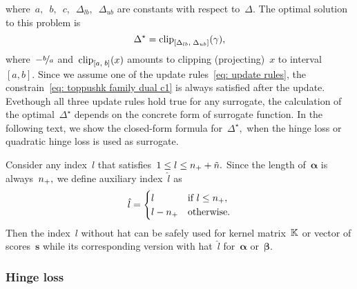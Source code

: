 where~$a,$~$b,$~$c,$~$\Delta_{lb},$~$\Delta_{ub}$ are constants with respect to~$\Delta.$ The optimal solution to this problem is
\begin{equation}\label{eq: Delta optimal}
  \Delta^{\star} = \clip{\Delta_{lb}}{\Delta_{ub}}{\gamma},
\end{equation}
where~$-\nicefrac{b}{a}$ and~$\clip{a}{b}{x}$ amounts to clipping (projecting)~$x$ to interval~$[a, b].$ Since we assume one of the update rules~\eqref{eq: update rules}, the constrain~\eqref{eq: toppushk family dual c1} is always satisfied after the update. Evethough all three update rules hold true for any surrogate, the calculation of the optimal~$\Delta^{\star}$ depends on the concrete form of surrogate function. In the following text, we show the closed-form formula for~$\Delta^{\star},$ when the hinge loss or quadratic hinge loss is used as surrogate.

\begin{notation}\label{not: dual update rules}
  Consider any index~$l$ that satisfies~$1 \leq l \leq n_{+} + \tilde{n}.$ Since the length of~$\bm{\alpha}$ is always~$n_{+},$ we define auxiliary index~$\hat{l}$ as 
  \begin{equation*}
    \hat{l} = \begin{cases}
      l & \text{if } l \leq n_{+}, \\
      l - n_{+} & \text{otherwise}.
    \end{cases}
  \end{equation*}
  Then the index~$l$ without hat can be safely used for kernel matrix~$\mathbb{K}$ or vector of scores~$\bm{s}$ while its corresponding version with hat~$\hat{l}$ for~$\bm{\alpha}$ or~$\bm{\beta}.$
\end{notation}

\subsubsection{Hinge loss}

